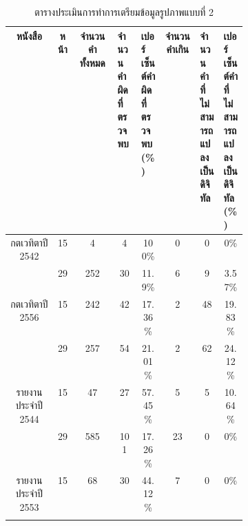 \begin{table}[H]
    \caption{ตารางประเมินการทำการเตรียมข้อมูลรูปภาพแบบที่ 2}\label{tbl:imagep2}
    \begin{tabular}{|c|c|c|p{0.1\linewidth}|p{0.1\linewidth}|c|p{0.1\linewidth}|p{0.1\linewidth}|}
            \hline
            หนังสือ                             & หน้า                       & จำนวนคำทั้งหมด & จำนวนคำผิดที่ตรวจพบ & เปอร์เซ็นต์คำผิดที่ตรวจพบ(\%)    & จำนวนคำเกิน & จำนวนคำที่ไม่สามารถแปลงเป็นดิจิทัล & เปอร์เซ็นต์คำที่ไม่สามารถแปลงเป็นดิจิทัล(\%)    \\ \hline
            \multirow{2}{*}{กตเวทิตาปี 2542}      & 15                         & \multicolumn{1}{c|}{4   }      & \multicolumn{1}{c|}{4  }         & \multicolumn{1}{c|}{100\%  } & \multicolumn{1}{c|}{0 }     & \multicolumn{1}{c|}{0  }             & \multicolumn{1}{c|}{0\%    } \\ \cline{2-8} 
                                                & 29                         & \multicolumn{1}{c|}{252 }      & \multicolumn{1}{c|}{30 }         & \multicolumn{1}{c|}{11.9\% } & \multicolumn{1}{c|}{6 }     & \multicolumn{1}{c|}{9  }             & \multicolumn{1}{c|}{3.57\% } \\ \hline
            \multirow{2}{*}{กตเวทิตาปี 2556}      & 15                         & \multicolumn{1}{c|}{242 }      & \multicolumn{1}{c|}{42 }         & \multicolumn{1}{c|}{17.36\%} & \multicolumn{1}{c|}{2 }     & \multicolumn{1}{c|}{48 }             & \multicolumn{1}{c|}{19.83\%} \\ \cline{2-8} 
                                                & 29                         & \multicolumn{1}{c|}{257 }      & \multicolumn{1}{c|}{54 }         & \multicolumn{1}{c|}{21.01\%} & \multicolumn{1}{c|}{2 }     & \multicolumn{1}{c|}{62 }             & \multicolumn{1}{c|}{24.12\%} \\ \hline
            \multirow{2}{*}{รายงานประจำปี 2544}   & 15                         & \multicolumn{1}{c|}{47  }      & \multicolumn{1}{c|}{27 }         & \multicolumn{1}{c|}{57.45\%} & \multicolumn{1}{c|}{5 }     & \multicolumn{1}{c|}{5  }             & \multicolumn{1}{c|}{10.64\%} \\ \cline{2-8} 
                                                & 29                         & \multicolumn{1}{c|}{585 }      & \multicolumn{1}{c|}{101}         & \multicolumn{1}{c|}{17.26\%} & \multicolumn{1}{c|}{23}     & \multicolumn{1}{c|}{0  }             & \multicolumn{1}{c|}{0\%    } \\ \hline
            \multirow{2}{*}{รายงานประจำปี 2553}   & 15                         & \multicolumn{1}{c|}{68  }      & \multicolumn{1}{c|}{30 }         & \multicolumn{1}{c|}{44.12\%} & \multicolumn{1}{c|}{7 }     & \multicolumn{1}{c|}{0  }             & \multicolumn{1}{c|}{0\%    } \\ \cline{2-8} 

\end{tabular}
\end{table}
